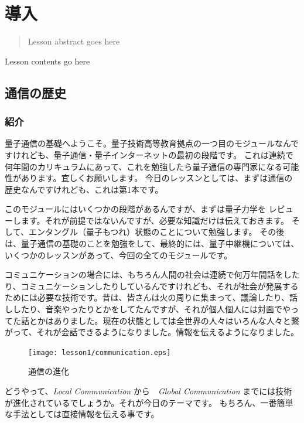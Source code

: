 \chapter[導入]
{導入}






\begin{abstract}
Lesson abstract goes here
\end{abstract}

Lesson contents go here

\section{通信の歴史}

\subsection{紹介}

量子通信の基礎へようこそ。量子技術高等教育拠点の一つ目のモジュールなんですけれども、量子通信・量子インターネットの最初の段階です。
これは連続で何年間のカリキュラムにあって、これを勉強したら量子通信の専門家になる可能性があります。宜しくお願いします。
今日のレッスンとしては、まずは通信の歴史なんですけれども、これは第1本です。

このモジュールにはいくつかの段階があるんですが、まずは量子力学を
レビューします。それが前提ではないんですが、必要な知識だけは伝えておきます。
そして、エンタングル（量子もつれ）状態のことについて勉強します。
その後は、量子通信の基礎のことを勉強をして、最終的には、量子中継機については、いくつかのレッスンがあって、今回の全てのモジュールです。

コミュニケーションの場合には、もちろん人間の社会は連続で何万年間話をしたり、コミュニケーションしたりしているんですけれども、それが社会が発展するためには必要な技術です。昔は、皆さんは火の周りに集まって、議論したり、話ししたり、音楽やったりとかをしてたんですが、それが個人個人には対面でやってた話とかはありました。現在の状態としては全世界の人々はいろんな人々と繋がって、それが会話できるようになりました。情報を伝えるようになりました。

\begin{figure}[H]
    \centering
    \texttt{[image: lesson1/communication.eps]}
    \label{図: 1}
    \caption{通信の進化}
\end{figure}

どうやって、\emph{Local Communication} から　\emph{Global Communication} までには技術が進化されているでしょうか。それが今日のテーマです。
もちろん、一番簡単な手法としては直接情報を伝える事です。
